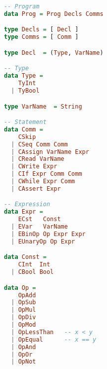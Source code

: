 \documentclass[a4paper]{book}
\begin{document}
{\footnotesize
\begin{center}
\begin{minipage}[h]{.6\textwidth}
\begin{lstlisting}[language=Haskell]
-- Program
data Prog = Prog Decls Comms

type Decls = [ Decl ]
type Comms = [ Comm ]

type Decl  = (Type, VarName)

-- Type
data Type =
    TyInt
  | TyBool

type VarName  = String

-- Statement
data Comm =
    CSkip
  | CSeq Comm Comm
  | CAssign VarName Expr
  | CRead VarName
  | CWrite Expr
  | CIf Expr Comm Comm
  | CWhile Expr Comm
  | CAssert Expr

-- Expression
data Expr =
    ECst   Const
  | EVar   VarName
  | EBinOp Op Expr Expr
  | EUnaryOp Op Expr

data Const =
    CInt  Int
  | CBool Bool

data Op =
    OpAdd
  | OpSub
  | OpMul
  | OpDiv
  | OpMod
  | OpLessThan   -- x < y
  | OpEqual      -- x == y
  | OpAnd
  | OpOr
  | OpNot
\end{lstlisting}
\end{minipage}
\end{center}
}




\end{document}
